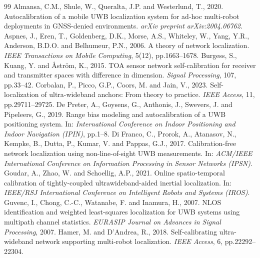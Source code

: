 \documentclass[10pt,a4paper]{article}
\begin{document}
\begingroup
\scriptsize
\begin{thebibliography}{99}
 Almansa, C.M., Shule, W., Queralta, J.P. and Westerlund, T., 2020. Autocalibration of a mobile UWB localization system for ad-hoc multi-robot deployments in GNSS-denied environments. \emph{arXiv preprint arXiv:2004.06762}.
 Aspnes, J., Eren, T., Goldenberg, D.K., Morse, A.S., Whiteley, W., Yang, Y.R., Anderson, B.D.O. and Belhumeur, P.N., 2006. A theory of network localization. \emph{IEEE Transactions on Mobile Computing}, 5(12), pp.1663--1678.
 Burgess, S., Kuang, Y. and \AA{}str\"om, K., 2015. TOA sensor network self-calibration for receiver and transmitter spaces with difference in dimension. \emph{Signal Processing}, 107, pp.33--42.
 Corbalan, P., Picco, G.P., Coors, M. and Jain, V., 2023. Self-localization of ultra-wideband anchors: From theory to practice. \emph{IEEE Access}, 11, pp.29711--29725.
 De Preter, A., Goysens, G., Anthonis, J., Swevers, J. and Pipeleers, G., 2019. Range bias modeling and autocalibration of a UWB positioning system. In: \emph{International Conference on Indoor Positioning and Indoor Navigation (IPIN)}, pp.1--8.
 Di Franco, C., Prorok, A., Atanasov, N., Kempke, B., Dutta, P., Kumar, V. and Pappas, G.J., 2017. Calibration-free network localization using non-line-of-sight UWB measurements. In: \emph{ACM/IEEE International Conference on Information Processing in Sensor Networks (IPSN)}.
 Goudar, A., Zhao, W. and Schoellig, A.P., 2021. Online spatio-temporal calibration of tightly-coupled ultrawideband-aided inertial localization. In: \emph{IEEE/RSJ International Conference on Intelligent Robots and Systems (IROS)}.
 Guvenc, I., Chong, C.-C., Watanabe, F. and Inamura, H., 2007. NLOS identification and weighted least-squares localization for UWB systems using multipath channel statistics. \emph{EURASIP Journal on Advances in Signal Processing}, 2007.
 Hamer, M. and D'Andrea, R., 2018. Self-calibrating ultra-wideband network supporting multi-robot localization. \emph{IEEE Access}, 6, pp.22292--22304.

\end{thebibliography}
\end{document}
